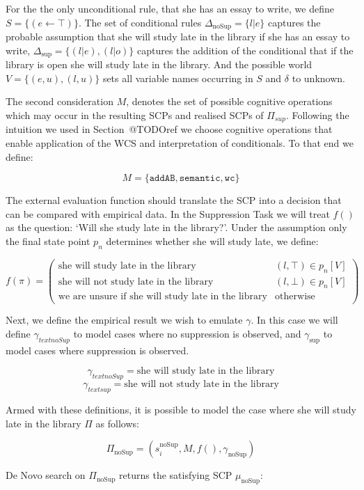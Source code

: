 For the the only unconditional rule, that she has an essay to write, we define $S=\{(e \leftarrow \top)\}$. The set of conditional rules $\Delta_{\text{noSup}}=\{l|e\}$ captures the probable assumption that she will study late in the library if she has an essay to write, $\Delta_{\text{sup}}=\{(l|e),(l|o)\}$ captures the addition of the conditional that if the library is open she will study late in the library. And the possible world $V=\{(e,u),(l,u)\}$ sets all variable names occurring in $S$ and $\delta$ to unknown.

The second consideration $M$, denotes the set of possible cognitive operations which may occur in the resulting SCPs and realised SCPs of $\Pi_{sup}$. Following the intuition we used in Section~@TODOref we choose cognitive operations that enable application of the WCS and interpretation of conditionals. To that end we define:

\[
M=\{\texttt{addAB}, \texttt{semantic}, \texttt{wc}\}
\]

The external evaluation function should translate the SCP into a decision that can be compared with empirical data. In the Suppression Task we will treat $f()$ as the question: `Will she study late in the library?'. Under the assumption only the final state point $p_n$
determines whether she will study late, we define:

\[
f(\pi) = \begin{pmatrix} \text{she will study late in the library} & (l,\top) \in p_n[V] \\   \text{she will not study late in the library} & (l,\bot) \in p_n[V] \\ 
\text{we are unsure if she will study late in the library} & \text{otherwise} \end{pmatrix}
\]

Next, we define the empirical result we wish to emulate $\gamma$. In this case we will define $\gamma_{text{noSup}}$ to model cases where no suppression is observed, and $\gamma_{\text{sup}}$ to model cases where suppression is observed.

\[\gamma_{text{noSup}} = \text{she will study late in the library} \]
\[\gamma_{text{sup}} = \text{she will not study late in the library} \]

Armed with these definitions, it is possible to model the case where she will study late in the library $\Pi$ as follows:

\[\Pi_\text{noSup}=(s_i^{\text{noSup}},M,f(),\gamma_{\text{noSup}})\]

De Novo search on $\Pi_\text{noSup}$ returns the satisfying SCP $\mu_\text{noSup}$:

